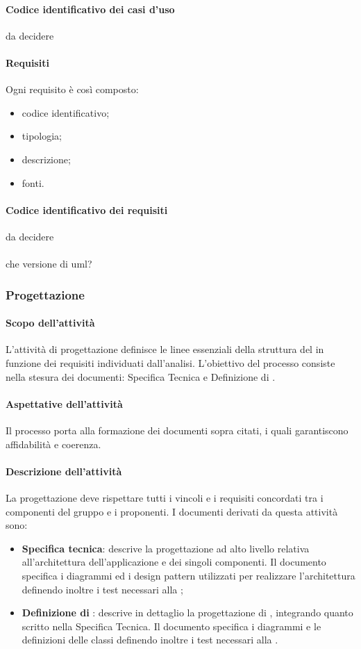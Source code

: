 \paragraph{Codice identificativo dei casi d'uso}
da decidere
 \paragraph{Requisiti}
 Ogni requisito è così composto:
  \begin{itemize}
  \item codice identificativo;
  \item tipologia;
  \item descrizione;
  \item fonti.
 \end{itemize}
 \paragraph{Codice identificativo dei requisiti}
 da decidere
 \paragraph{}
 che versione di uml?

\subsubsection{Progettazione}
 \paragraph{Scopo dell'attività}
L'attività di progettazione definisce le linee essenziali della struttura del   in
funzione dei requisiti individuati dall'analisi. L'obiettivo del processo consiste nella stesura dei
documenti: Specifica Tecnica e Definizione di .
 \paragraph{Aspettative dell'attività}
Il processo porta alla formazione dei documenti sopra citati, i quali garantiscono affidabilità e
coerenza.
 \paragraph{Descrizione dell'attività}
La progettazione deve rispettare tutti i vincoli e i requisiti concordati tra i componenti del gruppo
e i proponenti. I documenti derivati da questa attività sono:
\begin{itemize}
	\item \textbf{Specifica tecnica}: descrive la progettazione ad alto livello relativa all'architettura dell'applicazione
e dei singoli componenti. Il documento specifica i diagrammi  ed i design
pattern utilizzati per realizzare l'architettura definendo inoltre i test necessari alla ;
	\item \textbf{Definizione di }: descrive in dettaglio la progettazione di , integrando
quanto scritto nella Specifica Tecnica. Il documento specifica i diagrammi  e le
definizioni delle classi definendo inoltre i test necessari alla .
\end{itemize}
